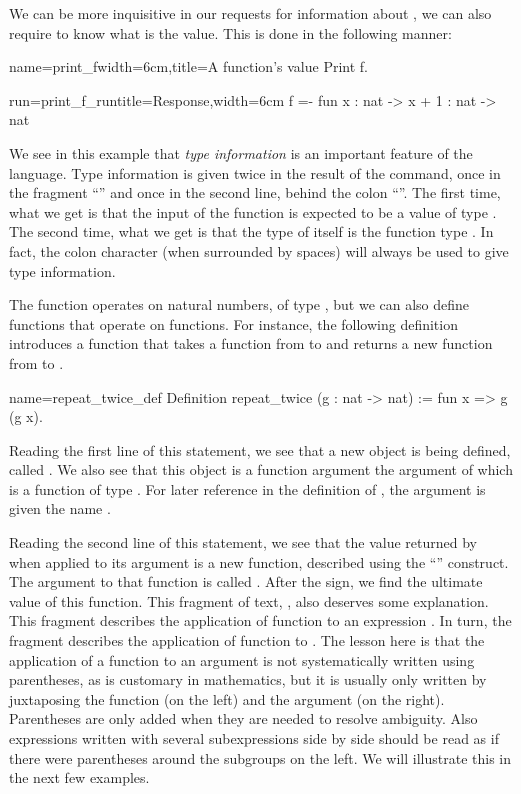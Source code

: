We can be more inquisitive in our requests for information about
, we can also require to know what is the value.  This is done in
the following manner:

\begin{coq}{name=print_f}{width=6cm,title=A function's value}
Print f.
\end{coq}
\begin{coqout}{run=print_f_run}{title=Response,width=6cm}
f =- fun x : nat -> x + 1
       : nat -> nat
\end{coqout}

We see in this example that {\em type information} is an important
feature of the language.  Type information is given twice in the
result of the  command, once in the fragment ``'' and once in the second line, behind the colon ``\C{:}''.  The first
time, what we get is that the input of the function is expected to be
a value of type .  The second time, what we get is that the
type of  itself is the function type .  In fact,
the colon character (when surrounded by spaces) will always be used to
give type information.

The function  operates on natural numbers, of type , but
we can also define functions that operate on functions.  For instance,
the following definition introduces a function that takes a function
from  to  and returns a new function from  to
.

\begin{coq}{name=repeat_twice_def}{}
Definition repeat_twice (g : nat -> nat) :=
  fun x => g (g x).
\end{coq}
Reading the first line of this statement, we see that a new object is
being defined, called .  We also see that this object
is a function argument the argument of which is a function of
type .  For later reference in the definition of
, the argument is given the name .

Reading the second line of this statement, we see that the value
returned by  when applied to its argument is a new
function, described using the ``'' construct.  The
argument to that function is called .  After the \C{=>} sign, we
find the ultimate value of this function.  This fragment of text, , also deserves some explanation.  This fragment describes the
application of function  to an expression .  In turn,
the fragment  describes the application of function  to
.  The lesson here is that the application of a function to an
argument is not systematically written using parentheses, as is
customary in mathematics, but it is usually only written by
juxtaposing the function (on the left) and the argument (on the
right).  Parentheses are only added when they are needed to resolve
ambiguity.  Also expressions written with several subexpressions side
by side should be read as if there were parentheses around the
subgroups on the left.  We will illustrate this in the next few
examples.

